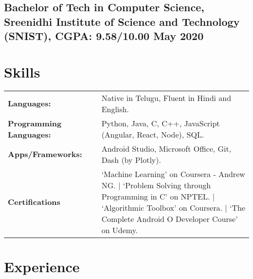 \documentclass[a4,10pt]{article}
\newcommand{\hskills}[1]{
\textbf{\bfseries #1} }
\begin{document}
\subsection*{Bachelor of Tech in Computer Science, {\normalsize \normalfont Sreenidhi Institute of Science and Technology (SNIST), CGPA: 9.58/10.00} \hfill May 2020} 
\vspace{0.2cm}



\section{Skills}
\begin{tabular}{p{11em} p{1em} p{43em}}
\hskills{Languages:} &  & Native in Telugu, Fluent in Hindi and English. \\
\hskills{Programming Languages:}&  &  Python, Java, C, C++, JavaScript (Angular, React, Node), SQL.  \\
\hskills{Apps/Frameworks:} &  & Android Studio, Microsoft Office, Git, Dash (by Plotly).   \\
\hskills{Certifications} &  & ‘Machine Learning’ on Coursera - Andrew NG. | ‘Problem Solving through Programming in C’ on NPTEL. | ‘Algorithmic Toolbox’ on Coursera. | ‘The Complete Android O Developer Course’ on Udemy. \\
\end{tabular}
\vspace{-0.2cm}




\section{Experience}

        
\end{document}
